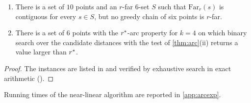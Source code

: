\begin{proposition}\label{prop:weaker}
\begin{enumerate}[label=(\alph*),itemsep=1pt,topsep=2pt]
\item There is a set of $10$ points and an $r$-far $6$-set $S$ such that
$\mathrm{Far}_r(s)$ is contiguous for every $s\in S$, but no greedy chain of six
points is $r$-far.
\item There is a set of $6$ points with the $r^{*}$-arc property for $k=4$ on
which binary search over the candidate distances with the test of
\cref{thm:arc}(ii) returns a value larger than $r^{*}$.
\end{enumerate}
\end{proposition}
\begin{proof}
The instances are listed in  and
verified by exhaustive search in exact arithmetic
().
\end{proof}

Running times of the near-linear algorithm are reported in \cref{app:arcexp}.

